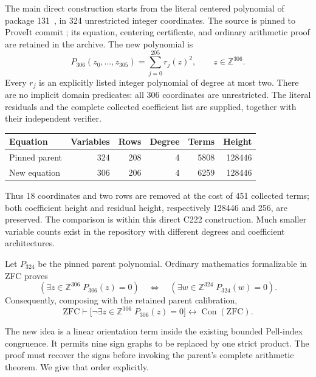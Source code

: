 \label{sec:signed306}

The main direct construction starts from the literal centered polynomial
of package 131~\cite{cap131}, in 324 unrestricted integer coordinates.  The source is
pinned to ProveIt commit
\srcpin; its equation, centering
certificate, and ordinary arithmetic proof are retained in the archive.
The new polynomial is
\begin{equation}\label{eq:306definition}
 P_{306}(z_0,\ldots,z_{305})=\sum_{j=0}^{205}r_j(z)^2,
 \qquad z\in\mathbb Z^{306}.
\end{equation}
Every $r_j$ is an explicitly listed integer polynomial of degree at most two.  There
are no implicit domain predicates: all 306 coordinates are unrestricted.
The literal residuals and the complete collected coefficient list are
supplied, together with their independent verifier.

\begin{center}
\begin{tabular}{lrrrrr}
\toprule
Equation & Variables & Rows & Degree & Terms & Height\\
\midrule
Pinned parent &324&208&4&5808&128446\\
New equation &306&206&4&6259&128446\\
\bottomrule
\end{tabular}
\end{center}

Thus 18 coordinates and two rows are removed at the cost of 451 collected
terms; both coefficient height and residual height, respectively 128446
and 256, are preserved.  The comparison is within this direct C222
construction.  Much smaller variable counts exist in the repository with
different degrees and coefficient architectures.

\begin{theorem}\label{thm:306-equivalence}
Let $P_{324}$ be the pinned parent polynomial.  Ordinary mathematics
formalizable in ZFC proves
\[
 (\exists z\in\mathbb Z^{306}\;P_{306}(z)=0)
 \quad\Longleftrightarrow\quad
 (\exists w\in\mathbb Z^{324}\;P_{324}(w)=0).
\]
Consequently, composing with the retained parent calibration,
\[
 \mathrm{ZFC}\vdash
 \bigl[\neg\exists z\in\mathbb Z^{306}\;P_{306}(z)=0\bigr]
 \longleftrightarrow\operatorname{Con}(\mathrm{ZFC}).
\]
\end{theorem}

The new idea is a linear orientation term inside the existing bounded
Pell-index congruence.  It permits nine sign graphs to be replaced by one
strict product.  The proof must recover the signs before invoking the
parent's complete arithmetic theorem.  We give that order explicitly.

